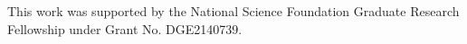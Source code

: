 
\setlength{\parskip}{1em}
\setlength{\parindent}{0em}

This work was supported by the National Science
Foundation Graduate Research Fellowship under Grant No. DGE2140739.

